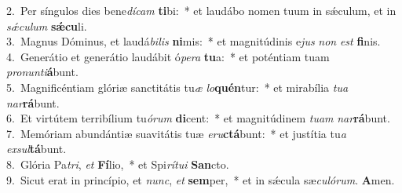 {2.~}Per síngulos dies bene\textit{dí}\textit{cam} \textbf{ti}bi:~* et laudábo nomen tuum in sǽculum, et in \textit{sǽ}\textit{cu}\textit{lum} \textbf{sǽ}\textbf{cu}li.\\
{3.~}Magnus Dóminus, et laudá\textit{bi}\textit{lis} \textbf{ni}mis:~* et magnitúdinis e\textit{jus} \textit{non} \textit{est} \textbf{fi}nis.\\
{4.~}Generátio et generátio laudábit ó\textit{pe}\textit{ra} \textbf{tu}a:~* et poténtiam tuam \textit{pro}\textit{nun}\textit{ti}\textbf{á}bunt.\\
{5.~}Magnificéntiam glóriæ sanctitátis tu\textit{æ} \textit{lo}\textbf{quén}tur:~* et mirabília \textit{tu}\textit{a} \textit{nar}\textbf{rá}bunt.\\
{6.~}Et virtútem terribílium tu\textit{ó}\textit{rum} \textbf{di}cent:~* et magnitúdinem \textit{tu}\textit{am} \textit{nar}\textbf{rá}bunt.\\
{7.~}Memóriam abundántiæ suavitátis tuæ \textit{e}\textit{ru}\textbf{ctá}bunt:~* et justítia tu\textit{a} \textit{ex}\textit{sul}\textbf{tá}bunt.\\
{8.~}Glória Pa\textit{tri}, \textit{et} \textbf{Fí}lio,~* et Spi\textit{rí}\textit{tu}\textit{i} \textbf{San}cto.\\
{9.~}Sicut erat in princípio, et \textit{nunc}, \textit{et} \textbf{sem}per,~* et in sǽcula sæ\textit{cu}\textit{ló}\textit{rum}. \textbf{A}men.\\

